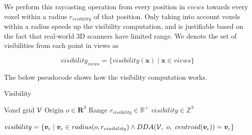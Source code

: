 We perform this raycasting operation from every position in \(views\) towards every voxel within a radius \(r_{visibility}\) of that position. Only taking into account voxels within a radius speeds up the visibility computation, and is justifiable based on the fact that real-world 3D scanners have limited range. We denote the set of visibilities from each point in views as 

\begin{equation}
    \label{eq:visibility_views}
visibility_{views} = \{visibility(\boldsymbol{x}) \mid \boldsymbol{x} \in views\}
\end{equation}

The below pseudocode shows how the visibility computation works.

\begin{algorithm}
    \caption{Visibility}
    \begin{algorithmic}

    \Require \quad Voxel grid \(\mathcal{V}\)
    \Require \quad Origin \(o \in \mathbf{R}^3\)
    \Require \quad Range \(r_{visibility} \in \mathbb{R}^+\)
    \Ensure \quad $visibility \in \mathbb{Z}^{3}$

    \State $visibility = \{\boldsymbol{v}_c \mid \boldsymbol{v}_c \in radius(o, r_{visibility}) \land DDA(\mathcal{V},\ o,\ centroid(\boldsymbol{v}_c)) = \boldsymbol{v}_c\}$

    \end{algorithmic}
\end{algorithm}

